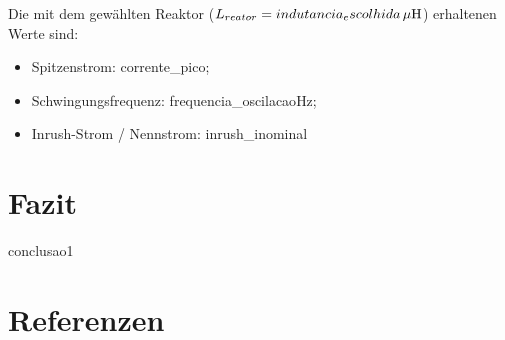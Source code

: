 \documentclass[a4paper]{article}
\begin{document}
Die mit dem gewählten Reaktor ($L_{reator} = {{indutancia_escolhida}} \, \mu \rm{H} $) erhaltenen Werte sind:
\begin{itemize}[label=\textendash]
	\item Spitzenstrom: {{corrente_pico}};
	\item Schwingungsfrequenz: {{frequencia_oscilacao}}Hz;
	\item Inrush-Strom / Nennstrom: {{inrush_inominal}}
\end{itemize}

\section{Fazit}
{{conclusao1}}

\section{Referenzen}
\end{document}
